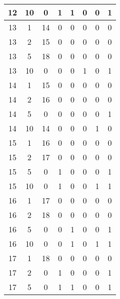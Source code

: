\begin{longtable}[c]{|c|c|c|c|c|c|c|c|}
12    & 10     & 0         & 1        & 1        & 0          & 0        & 1    \\ \hline
13    & 1      & 14        & 0        & 0        & 0          & 0        & 0    \\ \hline
13    & 2      & 15        & 0        & 0        & 0          & 0        & 0    \\ \hline
13    & 5      & 18        & 0        & 0        & 0          & 0        & 0    \\ \hline
13    & 10     & 0         & 0        & 0        & 1          & 0        & 1    \\ \hline
14    & 1      & 15        & 0        & 0        & 0          & 0        & 0    \\ \hline
14    & 2      & 16        & 0        & 0        & 0          & 0        & 0    \\ \hline
14    & 5      & 0         & 0        & 0        & 0          & 0        & 1    \\ \hline
14    & 10     & 14        & 0        & 0        & 0          & 1        & 0    \\ \hline
15    & 1      & 16        & 0        & 0        & 0          & 0        & 0    \\ \hline
15    & 2      & 17        & 0        & 0        & 0          & 0        & 0    \\ \hline
15    & 5      & 0         & 1        & 0        & 0          & 0        & 1    \\ \hline
15    & 10     & 0         & 1        & 0        & 0          & 1        & 1    \\ \hline
16    & 1      & 17        & 0        & 0        & 0          & 0        & 0    \\ \hline
16    & 2      & 18        & 0        & 0        & 0          & 0        & 0    \\ \hline
16    & 5      & 0         & 0        & 1        & 0          & 0        & 1    \\ \hline
16    & 10     & 0         & 0        & 1        & 0          & 1        & 1    \\ \hline
17    & 1      & 18        & 0        & 0        & 0          & 0        & 0    \\ \hline
17    & 2      & 0         & 1        & 0        & 0          & 0        & 1    \\ \hline
17    & 5      & 0         & 1        & 1        & 0          & 0        & 1    \\ \hline

\end{longtable}
